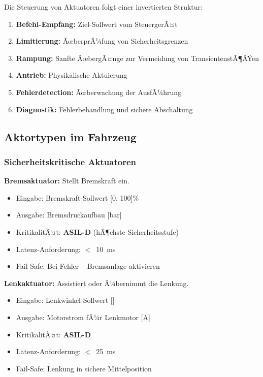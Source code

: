 ﻿\documentclass[a4paper,12pt]{article}
\begin{document}
Die Steuerung von Aktuatoren folgt einer invertierten Struktur:

\begin{enumerate}
	\item \textbf{Befehl-Empfang:} Ziel-Sollwert vom SteuergerÃ¤t
	\item \textbf{Limitierung:} ÃœberprÃ¼fung von Sicherheitsgrenzen
	\item \textbf{Rampung:} Sanfte ÃœbergÃ¤nge zur Vermeidung von TransientenstÃ¶ÃŸen
	\item \textbf{Antrieb:} Physikalische Aktuierung
	\item \textbf{Fehlerdetection:} Ãœberwachung der AusfÃ¼hrung
	\item \textbf{Diagnostik:} Fehlerbehandlung und sichere Abschaltung
\end{enumerate}

\subsection{Aktortypen im Fahrzeug}

\subsubsection{Sicherheitskritische Aktuatoren}

\textbf{Bremsaktuator:} Stellt Bremskraft ein.
\begin{itemize}
	\item Eingabe: Bremskraft-Sollwert [0, 100]\%
	\item Ausgabe: Bremsdruckaufbau [bar]
	\item KritikalitÃ¤t: \textbf{ASIL-D} (hÃ¶chste Sicherheitsstufe)
	\item Latenz-Anforderung: $<$~10~ms
	\item Fail-Safe: Bei Fehler -- Bremsanlage aktivieren
\end{itemize}

\textbf{Lenkaktuator:} Assistiert oder Ã¼bernimmt die Lenkung.
\begin{itemize}
	\item Eingabe: Lenkwinkel-Sollwert [\textdegree]
	\item Ausgabe: Motorstrom fÃ¼r Lenkmotor [A]
	\item KritikalitÃ¤t: \textbf{ASIL-D}
	\item Latenz-Anforderung: $<$~25~ms
	\item Fail-Safe: Lenkung in sichere Mittelposition
\end{itemize}
\end{document}
